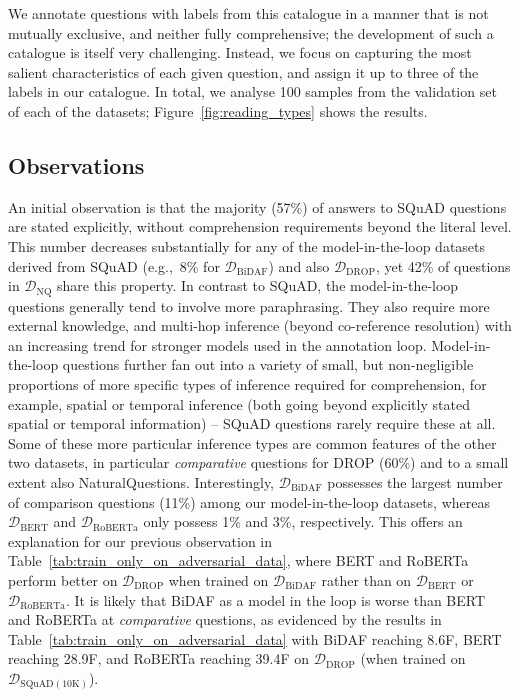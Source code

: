 \documentclass[11pt,a4paper]{article}
\newcommand{\dataset}[1]{\ensuremath{\mathcal{D_{\mathrm{#1}}}}}
\newcommand{\squad}{SQuAD}
\newcommand{\drop}{DROP}
\newcommand{\naturalquestions}{NaturalQuestions}
\begin{document}
We annotate questions with labels from this catalogue in a manner that is not mutually exclusive, and neither fully comprehensive; the development of such a catalogue is itself very challenging.
Instead, we focus on capturing the most salient characteristics of each given question, and assign it up to three of the labels in our catalogue.
In total, we analyse 100 samples from the validation set of each of the datasets; Figure~\ref{fig:reading_types} shows the results.



\subsection{Observations}

An initial observation is that the majority (57\%) of answers to \squad{} questions are stated explicitly, without comprehension requirements beyond the literal level.
This number decreases substantially for any of the model-in-the-loop datasets derived from \squad{} (e.g.,~8\% for \dataset{BiDAF}) and also \dataset{DROP}, yet 42\% of questions in \dataset{NQ} share this property.
In contrast to \squad{}, the model-in-the-loop questions generally tend to involve more paraphrasing.
They also require more external knowledge, and multi-hop inference (beyond co-reference resolution) with an increasing trend for stronger models used in the annotation loop.
Model-in-the-loop questions further fan out into a variety of small, but non-negligible proportions of more specific types of inference required for comprehension, for example, spatial or temporal inference (both going beyond explicitly stated spatial or temporal information) -- \squad{} questions rarely require these at all.
Some of these more particular inference types are common features of the other two datasets, in particular \emph{comparative} questions for \drop{} (60\%) and to a small extent also \naturalquestions{}.
Interestingly, \dataset{BiDAF} possesses the largest number of comparison questions (11\%) among our model-in-the-loop datasets, whereas \dataset{BERT} and \dataset{RoBERTa} only possess 1\% and 3\%, respectively.
This offers an explanation for our previous observation in Table~\ref{tab:train_only_on_adversarial_data}, where BERT and RoBERTa perform better on \dataset{DROP} when trained on \dataset{BiDAF} rather than on \dataset{BERT} or \dataset{RoBERTa}.
It is likely that BiDAF as a model in the loop is worse than BERT and RoBERTa at \emph{comparative} questions, as evidenced by the results in Table~\ref{tab:train_only_on_adversarial_data} with BiDAF reaching 8.6F, BERT reaching 28.9F, and RoBERTa reaching 39.4F on \dataset{DROP} (when trained on \dataset{SQuAD(10K)}).
\end{document}
